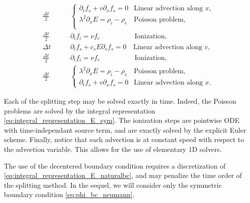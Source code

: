 \documentclass{article}
\numberwithin{equation}{section}
\newcommand{\todo}[1]{{\color{red}\textbf{#1}}}
\begin{document}
\begin{align*}
	\frac{\Delta t}{2} \quad\quad&
	\begin{cases}
		\partial_t f_s + v \partial_x f_s = 0 & \text{Linear advection along $x$,} \\
		\lambda^2 \partial_x E = \rho_i - \rho_e & \text{Poisson problem,} \\
	\end{cases} \\
	\frac{\Delta t}{2} \quad\quad&
	\partial_t f_i = \nu f_e \quad\quad\quad\quad\quad \text{Ionization,} \\
	\Delta t \quad\quad&
	\partial_t f_s + c_s E \partial_v f_s = 0 \quad \text{Linear advection along $v$,} \\
	\frac{\Delta t}{2} \quad\quad&
	\partial_t f_i = \nu f_e \quad\quad\quad\quad\quad \text{Ionization,} \\
	\frac{\Delta t}{2} \quad\quad&
	\begin{cases}
		\lambda^2 \partial_x E = \rho_i - \rho_e & \text{Poisson problem,}\\
		\partial_t f_s + v \partial_x f_s = 0 & \text{Linear advection along $x$.}
	\end{cases} 
\end{align*}



Each of the splitting step may be solved exactly in time.
Indeed, the Poisson problems are solved by the integral representation \cref{eq:integral_representation_E_sym}. The ionization steps are pointwise ODE with time-independant source term, and are exactly solved by the explicit Euler scheme. Finally, notice that each advection is at constant speed with respect to the advection variable. This allows for the use of elementary 1D solvers.  

The use of the decentered boundary condition requires a discretization of \cref{eq:integral_representation_E_naturalbc}, and may penalize the time order of the splitting method. In the sequel, we will consider only the symmetric boundary condition \cref{eq:phi_bc_neumann}.
\end{document}
